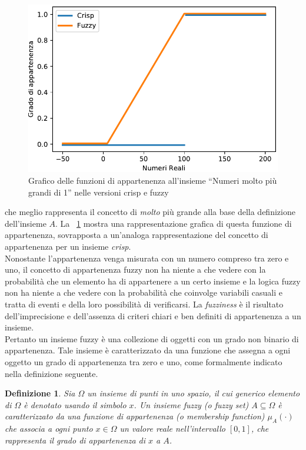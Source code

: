 \documentclass [11pt,a4paper,twoside,openright] {book}
\newtheorem{fuzzyset}{Definizione}
\begin{document}
\begin{figure}[!h]
\centering
\includegraphics[scale=0.6]{figure/fuzzycrisp.pdf}
\caption{Grafico delle funzioni di appartenenza all'insieme ``Numeri molto più grandi di 1'' nelle versioni crisp e fuzzy \label{fuzzycrisp}}
\end{figure}che meglio rappresenta il concetto di \textit{molto} più grande alla base della definizione dell'insieme $A$. La \figurename~\ref{fuzzycrisp} mostra una rappresentazione grafica di questa funzione di appartenenza, sovrapposta a un'analoga rappresentazione del concetto di appartenenza per un insieme \textit{crisp}.\\
Nonostante l'appartenenza venga misurata con un numero compreso tra zero e uno, il concetto di appartenenza fuzzy non ha niente a che vedere con la probabilità che un elemento ha di appartenere a un certo insieme e la logica fuzzy non ha niente a che vedere con la probabilità che coinvolge variabili casuali e tratta di eventi e della loro possibilità di verificarsi. La \textit{fuzziness} è il risultato dell'imprecisione e dell'assenza di criteri chiari e ben definiti di appartenenza a un insieme.\\
Pertanto un insieme fuzzy è una collezione di oggetti con un grado non binario di appartenenza. Tale insieme è caratterizzato da una funzione che assegna a ogni oggetto un grado di appartenenza tra zero e uno, come formalmente indicato nella definizione seguente\cite{zadeh1965fuzzy}.
\begin{fuzzyset}
Sia $\Omega$ un insieme di punti in uno spazio, il cui generico elemento di $\Omega$ è denotato usando il simbolo $x$. Un \textit{insieme fuzzy} (o \textit{fuzzy set}) $A \subseteq \Omega$ è caratterizzato da una funzione di \textit{appartenenza} (o \textit{membership function}) $\mu_{A}(\cdot)$ che associa a ogni punto $x \in \Omega$ un valore reale nell'intervallo $[0,1]$, che rappresenta il \textit{grado di appartenenza} di $x$ a $A$.
\end{fuzzyset}
\end{document}
